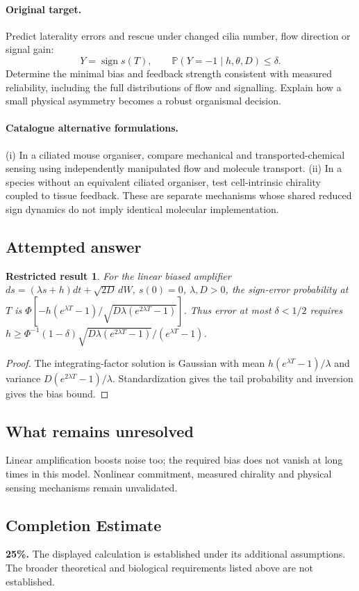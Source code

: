 \documentclass[11pt]{article}
\newcommand{\Prob}{\mathbb P}
\providecommand{\Prob}{\mathbb P}
\newtheorem{attemptresult}{Restricted result}[section]
\begin{document}
\paragraph{Original target.}
Predict laterality errors and rescue under changed cilia number, flow direction or signal gain:
\[
Y=\operatorname{sign}s(T),\qquad
\Prob(Y=-1\mid h,\theta,D)\leq\delta.
\]
Determine the minimal bias and feedback strength consistent with measured reliability, including the full distributions of flow and signalling. Explain how a small physical asymmetry becomes a robust organismal decision.
\paragraph{Catalogue alternative formulations.}
(i) In a ciliated mouse organiser, compare mechanical and transported-chemical sensing using independently manipulated flow and molecule transport. (ii) In a species without an equivalent ciliated organiser, test cell-intrinsic chirality coupled to tissue feedback. These are separate mechanisms whose shared reduced sign dynamics do not imply identical molecular implementation.
\subsection{Attempted answer}
\begin{attemptresult}
For the linear biased amplifier $ds=(\lambda s+h)dt+\sqrt{2D}\,dW$, $s(0)=0$, $\lambda,D>0$, the sign-error probability at $T$ is $\Phi[-h(e^{\lambda T}-1)/\sqrt{D\lambda(e^{2\lambda T}-1)}]$. Thus error at most $\delta<1/2$ requires $h\geq\Phi^{-1}(1-\delta)\sqrt{D\lambda(e^{2\lambda T}-1)}/(e^{\lambda T}-1)$.
\end{attemptresult}
\begin{proof}
The integrating-factor solution is Gaussian with mean $h(e^{\lambda T}-1)/\lambda$ and variance $D(e^{2\lambda T}-1)/\lambda$. Standardization gives the tail probability and inversion gives the bias bound.
\end{proof}
\subsection{What remains unresolved}
Linear amplification boosts noise too; the required bias does not vanish at long times in this model. Nonlinear commitment, measured chirality and physical sensing mechanisms remain unvalidated.
\subsection{Completion Estimate}
\textbf{25\%.} The displayed calculation is established under its additional assumptions. The broader theoretical and biological requirements listed above are not established.
\end{document}
